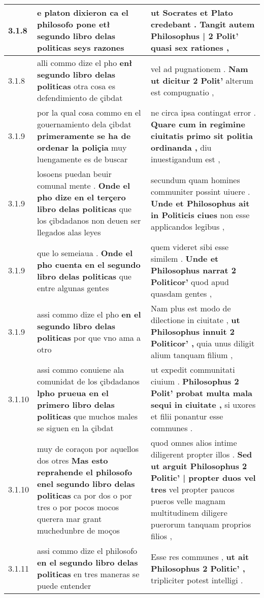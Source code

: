\begin{tabular}{|p{1cm}|p{6.5cm}|p{6.5cm}|}
3.1.8 & e platon dixieron \textbf{ ca el philosofo pone etł segundo libro delas politicas } seys razones & ut Socrates et Plato credebant . \textbf{ Tangit autem Philosophus | 2 Polit’ } quasi sex rationes , \\\hline
3.1.8 & alli commo dize el pho \textbf{ enł segundo libro delas politicas } otra cosa es defendimiento de çibdat & vel ad pugnationem . \textbf{ Nam ut dicitur 2 Polit’ } alterum est compugnatio , \\\hline
3.1.9 & por la qual cosa commo en el gouernamiento dela çibdat \textbf{ primeramente se ha de ordenar la poliçia } muy luengamente es de buscar & ne circa ipsa contingat error . \textbf{ Quare cum in regimine ciuitatis primo sit politia ordinanda , } diu inuestigandum est , \\\hline
3.1.9 & losoens puedan beuir comunal mente . \textbf{ Onde el pho dize en el terçero libro delas politicas } que los çibdadanos non deuen ser llegados alas leyes & secundum quam homines communiter possint uiuere . \textbf{ Unde et Philosophus ait in Politicis ciues } non esse applicandos legibus , \\\hline
3.1.9 & que lo semeiaua . \textbf{ Onde el pho cuenta en el segundo libro delas politicas } que entre algunas gentes & quem videret sibi esse similem . \textbf{ Unde et Philosophus narrat 2 Politicor’ } quod apud quasdam gentes , \\\hline
3.1.9 & assi commo dize el pho \textbf{ en el segundo libro delas politicas } por que vno ama a otro & Nam plus est modo de dilectione in ciuitate , \textbf{ ut Philosophus innuit 2 Politicor’ , } quia unus diligit alium tanquam filium , \\\hline
3.1.10 & assi commo conuiene ala comunidat de los çibdadanos \textbf{ lpho prueua en el primero libro delas politicas } que muchos males se siguen en la çibdat & ut expedit communitati ciuium . \textbf{ Philosophus 2 Polit’ probat multa mala sequi in ciuitate , } si uxores et filii ponantur esse communes . \\\hline
3.1.10 & muy de coraçon por aquellos dos otres \textbf{ Mas esto reprahende el philosofo enel segundo libro delas politicas } ca por dos o por tres o por pocos mocos querera mar grant muchedunbre de moços & quod omnes alios intime diligerent propter illos . \textbf{ Sed ut arguit Philosophus 2 Politic’ | propter duos vel tres } vel propter paucos pueros velle magnam multitudinem diligere puerorum tanquam proprios filios , \\\hline
3.1.11 & assi commo dize el philosofo \textbf{ en el segundo libro delas politicas } en tres maneras se puede entender & Esse res communes , \textbf{ ut ait Philosophus 2 Politic’ , } tripliciter potest intelligi . \\\hline

\end{tabular}
